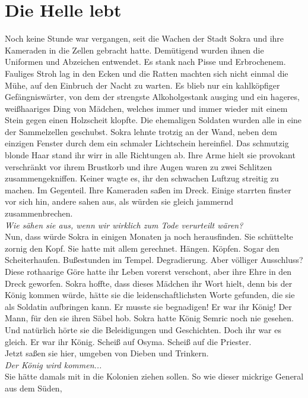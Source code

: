 \chapter{Die Helle lebt}

Noch keine Stunde war vergangen, seit die Wachen der Stadt Sokra und ihre Kameraden in die Zellen 
gebracht hatte. Demütigend wurden ihnen die Uniformen und Abzeichen entwendet. Es stank nach Pisse 
und Erbrochenem. Fauliges Stroh lag in den Ecken und die Ratten machten sich nicht einmal die Mühe, 
auf den Einbruch der Nacht zu warten. Es blieb nur ein kahlköpfiger Gefängniswärter, von dem der 
strengste Alkoholgestank ausging und ein hageres, weißhaariges Ding von Mädchen, welches immer und 
immer wieder mit einem Stein gegen einen Holzscheit klopfte. Die ehemaligen Soldaten wurden alle in 
eine der Sammelzellen geschubst. Sokra lehnte trotzig an der Wand, neben dem einzigen Fenster durch 
dem ein schmaler Lichtschein hereinfiel. Das schmutzig blonde Haar stand ihr wirr in alle Richtungen 
ab. Ihre Arme hielt sie provokant verschränkt vor ihrem Brustkorb und ihre Augen waren zu zwei 
Schlitzen zusammengekniffen. Keiner wagte es, ihr den schwachen Luftzug streitig zu machen. Im 
Gegenteil. Ihre Kameraden saßen im Dreck. Einige starrten finster vor sich hin, andere sahen aus, 
als würden sie gleich jammernd zusammenbrechen.\\
\textit{Wie sähen sie aus, wenn wir wirklich zum Tode verurteilt wären?}\\
Nun, dass würde Sokra in einigen Monaten ja noch herausfinden. Sie schüttelte zornig den Kopf. Sie 
hatte mit allem gerechnet. Hängen. Köpfen. Sogar den Scheiterhaufen. Bußestunden im Tempel. 
Degradierung. Aber völliger Ausschluss? Diese rothaarige Göre hatte ihr Leben vorerst verschont, 
aber ihre Ehre in den Dreck geworfen. Sokra hoffte, dass dieses Mädchen ihr Wort hielt, denn bis 
der König kommen würde, hätte sie die leidenschaftlichsten Worte gefunden, die sie als Soldatin 
aufbringen kann. Er musste sie begnadigen! Er war ihr König! Der Mann, für den sie ihren Säbel 
hob. Sokra hatte König Semric noch nie gesehen. Und natürlich hörte sie die Beleidigungen und 
Geschichten. Doch ihr war es gleich. Er war ihr König. Scheiß auf Osyma. Scheiß auf die Priester.\\
Jetzt saßen sie hier, umgeben von Dieben und Trinkern.\\
\textit{Der König wird kommen...}\\
Sie hätte damals mit in die Kolonien ziehen sollen. So wie dieser mickrige General aus dem Süden, 
